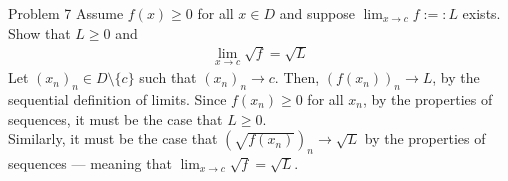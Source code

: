\documentclass[10pt]{extarticle}
\begin{document}
  \begin{problem}{Problem 7}
    Assume $f(x) \geq 0$ for all $x\in D$ and suppose $\lim_{x\rightarrow c} f :=: L$ exists. Show that $L\geq 0$ and
    \begin{align*}
      \lim_{x\rightarrow c} \sqrt{f} = \sqrt{L}
    \end{align*}
    \tcblower
    Let $(x_n)_n \in D\setminus \{c\}$ such that $(x_n)_n \rightarrow c$. Then, $(f(x_n))_n \rightarrow L$, by the sequential definition of limits. Since $f(x_n) \geq 0$ for all $x_n$, by the properties of sequences, it must be the case that $L \geq 0$.\\

    Similarly, it must be the case that $\left(\sqrt{f(x_n)}\right)_n \rightarrow \sqrt{L}$ by the properties of sequences --- meaning that $\lim_{x\rightarrow c}\sqrt{f} = \sqrt{L}$.
  \end{problem}
\end{document}
